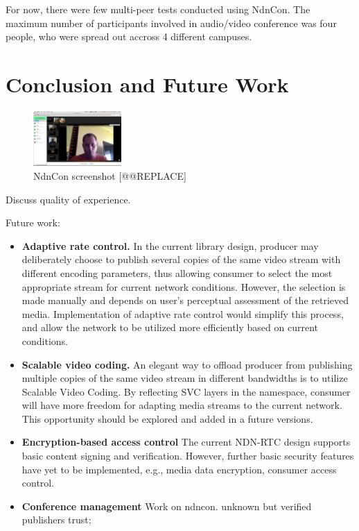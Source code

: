 \documentclass{icn/sig-alternate-2012} %
\newcommand{\ndnrtcName}{NDN-RTC} %
\newcommand{\ndnconName}{NdnCon}
\begin{document}
For now, there were few multi-peer tests conducted using NdnCon. The maximum number of participants involved in audio/video conference was four people, who were spread out accross 4 different campuses.

\section{Conclusion and Future Work}
\label{sec:conclusion}


\begin{figure}[t!]
\centering
\includegraphics[width=0.3\textwidth]{ndncon}
\caption{\ndnconName{} screenshot [@@REPLACE]}
\label{fig:ndncon}
\end{figure}


Discuss quality of experience. 

Future work: 
\begin{itemize}[label={}]
\item \textbf{Adaptive rate control.} In the current library design, producer may deliberately choose to publish several copies of the same video stream with different encoding parameters, thus allowing consumer to select the most appropriate stream for current network conditions. However, the selection is made manually and depends on user's perceptual assessment of the retrieved media. Implementation of adaptive rate control would simplify this process, and allow the network to be utilized more efficiently based on current conditions.

\item \textbf{Scalable video coding.} An elegant way to offload producer from publishing multiple copies of the same video stream in different bandwidths is to utilize Scalable Video Coding. By reflecting SVC layers in the namespace, consumer will have more freedom for adapting media streams to the current network. This opportunity should be explored and added in a future versions.

\item \textbf{Encryption-based access control} The current \ndnrtcName{} design supports basic content signing and verification. However, further basic security features have yet to be implemented, e.g., media data encryption, consumer access control.

\item \textbf{Conference management} 
Work on ndncon. unknown but verified publishers trust; 
\end{itemize}
\end{document}
